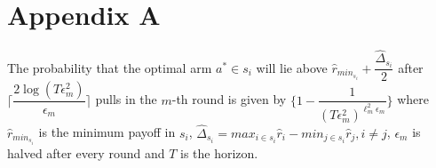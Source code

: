 
\appendix




\section*{Appendix A}
\begin{proposition}
The probability that the optimal arm $a^{*}\in s_{i}$ will lie above $\hat{r}_{min_{s_{i}}}+ \dfrac{\hat{\Delta}_{s_{i}}}{2}$ after $\bigg\lceil\dfrac{2\log (T\epsilon_{m}^{2})}{\epsilon_{m}}\bigg\rceil$ pulls in the $m$-th round is given by $\bigg\lbrace 1- \dfrac{1}{(T\epsilon_{m}^{2})^{\ell_{m}^{2}\epsilon_{m}}} \bigg\rbrace$ where $\hat{r}_{min_{s_{i}}}$ is the minimum payoff in $s_{i}$, $\hat{\Delta}_{s_{i}}=max_{i\in s_{i}}\hat{r}_{i}-min_{j\in s_{i}}\hat{r}_{j}, i\neq j$, $\epsilon_{m}$ is halved after every round and $T$ is the horizon. 
\end{proposition}


